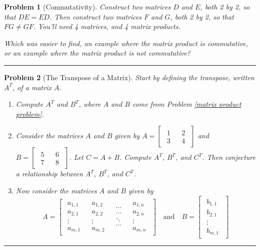 \documentclass[letterpaper,oneside]{book}%
\theoremstyle{plain}
\theoremstyle{box}
\theoremstyle{problem}
\newtheorem{problemnum}{Problem}[chapter]
\newenvironment{problem}[1][]{\begin{problemnum}[#1]}{\end{problemnum}\nopagebreak\hrule\bigskip}
\newcommand{\nvec}[1]{\begin{matrix} #1 \end{matrix}}
\begin{document}
\begin{problem}[Commutativity]
Construct two matrices $D$ and $E$, both 2 by 2, so that $DE=ED$.  
Then construct two matrices $F$ and $G$, both 2 by 2, so that $FG\neq GF$. 
You'll need 4 matrices, and 4 matrix products. 

Which was easier to find, an example where the matrix product is commutative, or an example where the matrix product is not commutative?
\end{problem}

\begin{problem}[The Transpose of a Matrix]
Start by defining the transpose, written $A^T$, of a matrix $A$.  
\begin{enumerate}
 \item Compute $A^T$ and $B^T$, where $A$ and $B$ come from Problem \ref{matrix product problem}.
 \item Consider the matrices $A$ and $B$ given by
$A
=\begin{bmatrix}
\nvec{1\\3}
&\nvec{2\\4}
\end{bmatrix}
$ and 
$B 
=\begin{bmatrix}
\nvec{5\\7}
&\nvec{6\\8}
\end{bmatrix}$. Let $C=A+B$. Compute $A^T$, $B^T$, and $C^T$. Then conjecture a relationship between $A^T$, $B^T$, and $C^T$. 
 \item Now consider the matrices $A$ and $B$ given by
$$A
=\begin{bmatrix}
\nvec{a_{1,1}\\a_{2,1}\\\vdots\\a_{m,1}}
&\nvec{a_{1,2}\\a_{2,2}\\\vdots\\a_{m,2}}
&\nvec{\cdots\\\cdots\\\ddots\\\cdots}
&\nvec{a_{1,n}\\a_{2,n}\\\vdots\\a_{m,n}}
\end{bmatrix}
\quad \text{and}\quad 
B 
=\begin{bmatrix}
\nvec{b_{1,1}\\b_{2,1}\\\vdots\\b_{m,1}}

\end{bmatrix}$$
\end{enumerate}
\end{problem}
\end{document}
